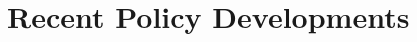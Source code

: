 \documentclass{sig-alternate}
\begin{document}




%

\section{Recent Policy Developments}
\end{document}
